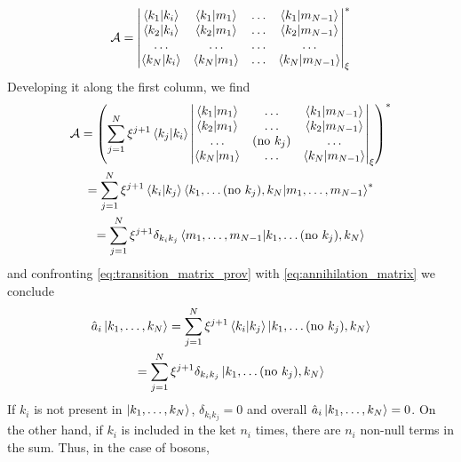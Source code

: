 \begin{equation}
    \mathcal{A} = \begin{vmatrix}
        \braket{k_1}{k_i} & \braket{k_1}{m_1} & \dots & \braket{k_1}{m_{N-1} } \\
        \braket{k_2}{k_i} & \braket{k_2}{m_1} & \dots & \braket{k_2}{m_{N-1}}  \\
        \dots             & \dots             & \dots & \dots                  \\
        \braket{k_N}{k_i} & \braket{k_N}{m_1} & \dots & \braket{k_N}{m_{N-1}}  \\
    \end{vmatrix}_\xi^*
\end{equation}
Developing it along the first column, we find
\begin{multline}
    \label{eq:transition_matrix_prov}
    \mathcal{A} = \left( \sum_{j=1}^N \xi^{j+1} \braket{k_j}{k_i}
    \begin{vmatrix}
        \braket{k_1}{m_1} & \dots            & \braket{k_1}{m_{N-1} } \\
        \braket{k_2}{m_1} & \dots            & \braket{k_2}{m_{N-1}}  \\
        \dots             & (\text{no } k_j) & \dots                  \\
        \braket{k_N}{m_1} & \dots            & \braket{k_N}{m_{N-1}}  \\
    \end{vmatrix}_\xi
    \right)^*
    \\ = \sum_{j=1}^N \xi^{j+1} \braket{k_i}{k_j}  \bra{k_1, \dots (\text{no } k_j), k_N} \ket{m_1, \dots, m_{N-1}}^*
    \\ = \sum_{j=1}^N \xi^{j+1} \delta_{k_ik_j}  \bra{m_1, \dots, m_{N-1}} \ket{k_1, \dots (\text{no } k_j), k_N}
\end{multline}
and confronting \cref{eq:transition_matrix_prov} with \cref{eq:annihilation_matrix} we conclude
\begin{multline} \label{eq:annihilation_operator}
    \hat{a}_i \ket{k_1, \dots, k_N}
    = \sum_{j=1}^N \xi^{j+1} \braket{k_i}{k_j} \ket{k_1, \dots (\text{no } k_j), k_N}
    \\= \sum_{j=1}^N \xi^{j+1} \delta_{k_ik_j} \ket{k_1, \dots (\text{no } k_j), k_N}
\end{multline}
If $k_i$ is not present in $\ket{k_1, \dots, k_N}$, $\delta_{k_ik_j} = 0$ and overall $ \hat{a}_i \ket{k_1, \dots, k_N} = 0$. On the other hand, if $k_i$ is included in the ket $n_i$ times, there are $n_i$ non-null terms in the sum. Thus, in the case of bosons,
